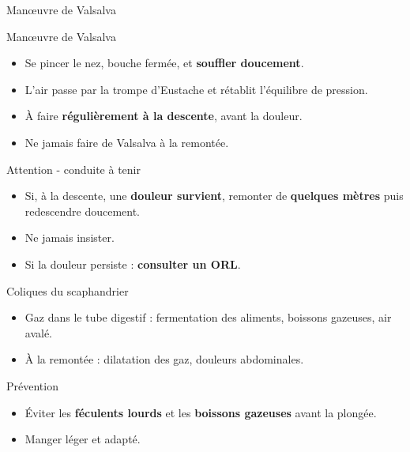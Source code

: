 \begin{frame}{Manœuvre de Valsalva}
  \begin{block}{Manœuvre de Valsalva}
    \begin{itemize}
      \item Se pincer le nez, bouche fermée, et \textbf{souffler doucement}.
      \item L’air passe par la trompe d’Eustache et rétablit l’équilibre de pression.
      \item À faire \textbf{régulièrement à la descente}, avant la douleur.
      \item \alert{Ne jamais faire de Valsalva à la remontée}.
    \end{itemize}
  \end{block}
  
  \vspace{0.2cm}

  \begin{alertblock}{Attention - conduite à tenir}
    \begin{itemize}
      \item Si, à la descente, une \textbf{douleur survient}, remonter de
            \textbf{quelques mètres} puis redescendre doucement.
      \item \alert{Ne jamais insister}.
      \item Si la douleur persiste : \textbf{consulter un ORL}.
    \end{itemize}
  \end{alertblock}
\end{frame}

\begin{frame}{Coliques du scaphandrier}
  \begin{itemize}
    \item Gaz dans le tube digestif : fermentation des aliments, boissons gazeuses, air avalé.
    \item À la remontée : dilatation des gaz, douleurs abdominales.
  \end{itemize}
  \begin{block}{Prévention}
    \begin{itemize}
      \item Éviter les \textbf{féculents lourds} et les \textbf{boissons gazeuses} avant la plongée.
      \item Manger léger et adapté.
    \end{itemize}
  \end{block}
\end{frame}
